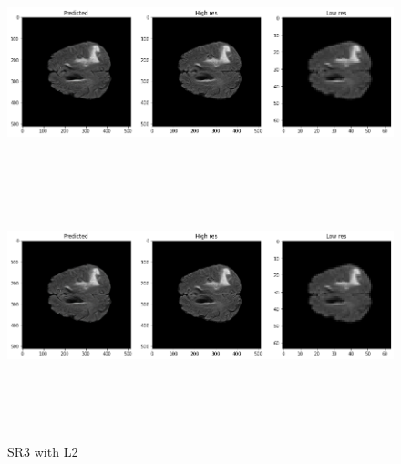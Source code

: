 \begin{figure}[!htbp]
  \begin{center}
    \leavevmode
    \ifpdf
      \includegraphics[height=2in]{Chapter4/images/spam1.png}
    \else
      \includegraphics[bb = 92 86 545 742, height=3in]{Chapter4/images/spam1.png}
    \fi
    \caption{SR3 with L2}
    \label{SR3 L2}
  \end{center}
\end{figure} 

